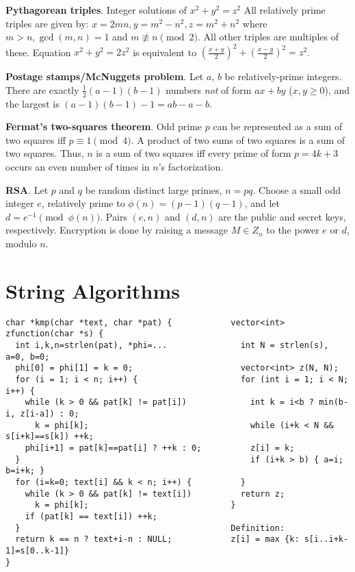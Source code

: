\documentclass[a4paper, 12pt]{article}
\let\ge=\geqslant
\newcommand{\Section}[1]{
  \section*{#1}
  \addcontentsline{toc}{subsection}{#1}
  \vspace{-3mm}
}
\newcommand{\Topic}[1]{\textbf{#1}}
\begin{document}
\Topic{Pythagorean triples}.  Integer solutions of $x^2 + y^2 = z^2$
All relatively prime triples are given by:
$x=2mn, y=m^2-n^2, z=m^2+n^2$ where $m>n, \gcd(m,n)=1$ and $m \not\equiv n \pmod{2}$.
All other triples are multiples of these.
Equation $x^2 + y^2 = 2z^2$ is equivalent to $(\frac{x+y}{2})^2 + (\frac{x-y}{2})^2 = z^2$.

\Topic{Postage stamps/McNuggets problem}.  Let $a$, $b$ be relatively-prime integers.
There are exactly $\frac{1}{2}(a-1)(b-1)$ numbers \emph{not} of form $ax+by$ ($x,y \ge 0$),
and the largest is $(a-1)(b-1)-1 = ab - a - b$.

\Topic{Fermat's two-squares theorem}.  Odd prime $p$ can be represented
as a sum of two squares iff $p \equiv 1 {\pmod 4}$.
A product of two sums of two squares is a sum of two squares.
Thus, $n$ is a sum of two squares iff every prime of
form $p=4k+3$ occurs an even number of times in $n$'s factorization.

\Topic{RSA}. Let $p$ and $q$ be random distinct large primes, $n = pq$.
Choose a small odd integer $e$, relatively prime to $\phi(n) = (p-1)(q-1)$,
and let $d = e^{-1} \pmod{\phi(n)}$. Pairs $(e,n)$ and $(d,n)$ are
the public and secret keys, respectively.
Encryption is done by raising a message $M \in Z_n$ to the power $e$ or $d$,
modulo $n$.



\newpage
\Section{String Algorithms}

\begin{Verbatim}[fontsize=\small]
char *kmp(char *text, char *pat) {            vector<int> zfunction(char *s) {
  int i,k,n=strlen(pat), *phi=...               int N = strlen(s), a=0, b=0;
  phi[0] = phi[1] = k = 0;                      vector<int> z(N, N);
  for (i = 1; i < n; i++) {                     for (int i = 1; i < N; i++) {
    while (k > 0 && pat[k] != pat[i])             int k = i<b ? min(b-i, z[i-a]) : 0;
      k = phi[k];                                 while (i+k < N && s[i+k]==s[k]) ++k;
    phi[i+1] = pat[k]==pat[i] ? ++k : 0;          z[i] = k;
  }                                               if (i+k > b) { a=i; b=i+k; }
  for (i=k=0; text[i] && k < n; i++) {          }
    while (k > 0 && pat[k] != text[i])          return z;
      k = phi[k];                             }
    if (pat[k] == text[i]) ++k;                
  }                                           Definition:
  return k == n ? text+i-n : NULL;            z[i] = max {k: s[i..i+k-1]=s[0..k-1]}
}
\end{Verbatim}
\vspace{-3mm}
\end{document}
